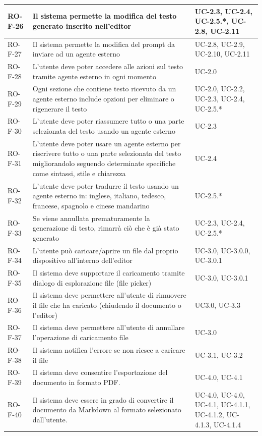 \documentclass[11pt,a4paper]{article}
\begin{document}
\begin{longtable}{|p{}|>{\raggedright\arraybackslash}p{}|p{}|}
\hline
RO-F-26 & Il sistema permette la modifica del testo generato inserito nell'editor & UC-2.3, UC-2.4, UC-2.5.*, UC-2.8, UC-2.11 \\
\hline
RO-F-27 & Il sistema permette la modifica del prompt da inviare ad un agente esterno & UC-2.8, UC-2.9, UC-2.10, UC-2.11 \\
\hline
RO-F-28 & L'utente deve poter accedere alle azioni sul testo tramite agente esterno in ogni momento & UC-2.0 \\
\hline
RO-F-29 & Ogni sezione che contiene testo ricevuto da un agente esterno include opzioni per eliminare o rigenerare il testo & UC-2.0, UC-2.2, UC-2.3, UC-2.4, UC-2.5.* \\
\hline
RO-F-30 & L'utente deve poter riassumere tutto o una parte selezionata del testo usando un agente esterno & UC-2.3 \\
\hline
RO-F-31 &  L'utente deve poter usare un agente esterno per riscrivere tutto o una parte selezionata del testo migliorandolo seguendo determinate specifiche come sintassi, stile e chiarezza & UC-2.4 \\
\hline
RO-F-32 & L'utente deve poter tradurre il testo usando un agente esterno in: inglese, italiano, tedesco, francese, spagnolo e cinese mandarino & UC-2.5.* \\
\hline
RO-F-33 & Se viene annullata prematuramente la generazione di testo, rimarrà ciò che è già stato generato & UC-2.3, UC-2.4, UC-2.5.* \\
\hline
RO-F-34 & L'utente può caricare/aprire un file dal proprio dispositivo all'interno dell'editor & UC-3.0, UC-3.0.0, UC-3.0.1 \\
\hline
RO-F-35 & Il sistema deve supportare il caricamento tramite dialogo di esplorazione file (file picker) & UC-3.0, UC-3.0.1 \\
\hline
RO-F-36 & Il sistema deve permettere all'utente di rimuovere il file che ha caricato (chiudendo il documento o l'editor) & UC3.0, UC-3.3 \\
\hline
RO-F-37 & Il sistema deve permettere all'utente di annullare l'operazione di caricamento file & UC-3.0 \\
\hline
RO-F-38 & Il sistema notifica l'errore se non riesce a caricare il file & UC-3.1, UC-3.2\\
\hline
RO-F-39 & Il sistema deve consentire l'esportazione del documento in formato PDF. & UC-4.0, UC-4.1\\
\hline
RO-F-40 & Il sistema deve essere in grado di convertire il documento da Markdown al formato selezionato dall'utente. & UC-4.0, UC-4.0, UC-4.1, UC-4.1.1, UC-4.1.2, UC-4.1.3, UC-4.1.4\\

\end{longtable}
\end{document}
